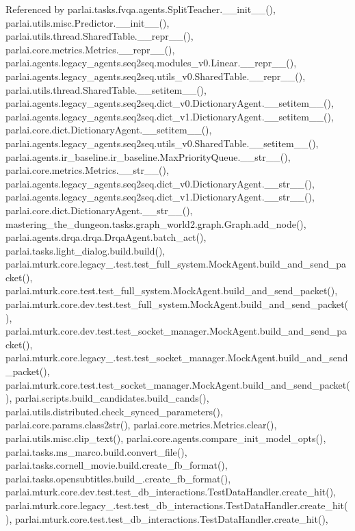 Referenced by parlai.\+tasks.\+fvqa.\+agents.\+Split\+Teacher.\+\_\+\+\_\+init\+\_\+\+\_\+(), parlai.\+utils.\+misc.\+Predictor.\+\_\+\+\_\+init\+\_\+\+\_\+(), parlai.\+utils.\+thread.\+Shared\+Table.\+\_\+\+\_\+repr\+\_\+\+\_\+(), parlai.\+core.\+metrics.\+Metrics.\+\_\+\+\_\+repr\+\_\+\+\_\+(), parlai.\+agents.\+legacy\+\_\+agents.\+seq2seq.\+modules\+\_\+v0.\+Linear.\+\_\+\+\_\+repr\+\_\+\+\_\+(), parlai.\+agents.\+legacy\+\_\+agents.\+seq2seq.\+utils\+\_\+v0.\+Shared\+Table.\+\_\+\+\_\+repr\+\_\+\+\_\+(), parlai.\+utils.\+thread.\+Shared\+Table.\+\_\+\+\_\+setitem\+\_\+\+\_\+(), parlai.\+agents.\+legacy\+\_\+agents.\+seq2seq.\+dict\+\_\+v0.\+Dictionary\+Agent.\+\_\+\+\_\+setitem\+\_\+\+\_\+(), parlai.\+agents.\+legacy\+\_\+agents.\+seq2seq.\+dict\+\_\+v1.\+Dictionary\+Agent.\+\_\+\+\_\+setitem\+\_\+\+\_\+(), parlai.\+core.\+dict.\+Dictionary\+Agent.\+\_\+\+\_\+setitem\+\_\+\+\_\+(), parlai.\+agents.\+legacy\+\_\+agents.\+seq2seq.\+utils\+\_\+v0.\+Shared\+Table.\+\_\+\+\_\+setitem\+\_\+\+\_\+(), parlai.\+agents.\+ir\+\_\+baseline.\+ir\+\_\+baseline.\+Max\+Priority\+Queue.\+\_\+\+\_\+str\+\_\+\+\_\+(), parlai.\+core.\+metrics.\+Metrics.\+\_\+\+\_\+str\+\_\+\+\_\+(), parlai.\+agents.\+legacy\+\_\+agents.\+seq2seq.\+dict\+\_\+v0.\+Dictionary\+Agent.\+\_\+\+\_\+str\+\_\+\+\_\+(), parlai.\+agents.\+legacy\+\_\+agents.\+seq2seq.\+dict\+\_\+v1.\+Dictionary\+Agent.\+\_\+\+\_\+str\+\_\+\+\_\+(), parlai.\+core.\+dict.\+Dictionary\+Agent.\+\_\+\+\_\+str\+\_\+\+\_\+(), mastering\+\_\+the\+\_\+dungeon.\+tasks.\+graph\+\_\+world2.\+graph.\+Graph.\+add\+\_\+node(), parlai.\+agents.\+drqa.\+drqa.\+Drqa\+Agent.\+batch\+\_\+act(), parlai.\+tasks.\+light\+\_\+dialog.\+build.\+build(), parlai.\+mturk.\+core.\+legacy\+\_.\+test.\+test\+\_\+full\+\_\+system.\+Mock\+Agent.\+build\+\_\+and\+\_\+send\+\_\+packet(), parlai.\+mturk.\+core.\+test.\+test\+\_\+full\+\_\+system.\+Mock\+Agent.\+build\+\_\+and\+\_\+send\+\_\+packet(), parlai.\+mturk.\+core.\+dev.\+test.\+test\+\_\+full\+\_\+system.\+Mock\+Agent.\+build\+\_\+and\+\_\+send\+\_\+packet(), parlai.\+mturk.\+core.\+dev.\+test.\+test\+\_\+socket\+\_\+manager.\+Mock\+Agent.\+build\+\_\+and\+\_\+send\+\_\+packet(), parlai.\+mturk.\+core.\+legacy\+\_.\+test.\+test\+\_\+socket\+\_\+manager.\+Mock\+Agent.\+build\+\_\+and\+\_\+send\+\_\+packet(), parlai.\+mturk.\+core.\+test.\+test\+\_\+socket\+\_\+manager.\+Mock\+Agent.\+build\+\_\+and\+\_\+send\+\_\+packet(), parlai.\+scripts.\+build\+\_\+candidates.\+build\+\_\+cands(), parlai.\+utils.\+distributed.\+check\+\_\+synced\+\_\+parameters(), parlai.\+core.\+params.\+class2str(), parlai.\+core.\+metrics.\+Metrics.\+clear(), parlai.\+utils.\+misc.\+clip\+\_\+text(), parlai.\+core.\+agents.\+compare\+\_\+init\+\_\+model\+\_\+opts(), parlai.\+tasks.\+ms\+\_\+marco.\+build.\+convert\+\_\+file(), parlai.\+tasks.\+cornell\+\_\+movie.\+build.\+create\+\_\+fb\+\_\+format(), parlai.\+tasks.\+opensubtitles.\+build\+\_.\+create\+\_\+fb\+\_\+format(), parlai.\+mturk.\+core.\+dev.\+test.\+test\+\_\+db\+\_\+interactions.\+Test\+Data\+Handler.\+create\+\_\+hit(), parlai.\+mturk.\+core.\+legacy\+\_.\+test.\+test\+\_\+db\+\_\+interactions.\+Test\+Data\+Handler.\+create\+\_\+hit(), parlai.\+mturk.\+core.\+test.\+test\+\_\+db\+\_\+interactions.\+Test\+Data\+Handler.\+create\+\_\+hit(), 